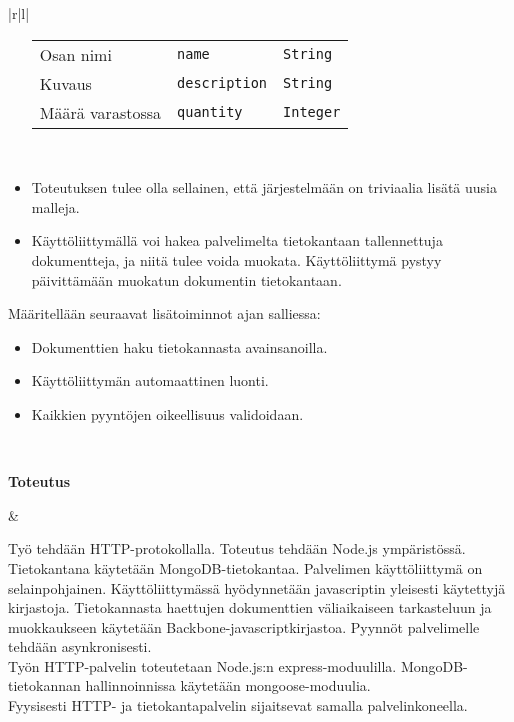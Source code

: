 \documentclass[a4paper, 12pt]{article}
\begin{document}
\begin{tabular}{|r|l|}
\begin{minipage}[t]{0.75\textwidth}
\begin{itemize}
	{\footnotesize
	\begin{tabular}{@{}l l l}
	Osan nimi & \texttt{name} & \texttt{String} \\
	Kuvaus & \texttt{description} & \texttt{String} \\
	Määrä varastossa & \texttt{quantity} & \texttt{Integer}
	\end{tabular}
	} \\
	
	\item Toteutuksen tulee olla sellainen, että järjestelmään on triviaalia lisätä uusia malleja.
	\item Käyttöliittymällä voi hakea palvelimelta tietokantaan tallennettuja dokumentteja, ja niitä tulee voida muokata. Käyttöliittymä pystyy päivittämään muokatun dokumentin tietokantaan.
	\end{itemize}

	Määritellään seuraavat lisätoiminnot ajan salliessa:
	\begin{itemize}
	\item Dokumenttien haku tietokannasta avainsanoilla.
	\item Käyttöliittymän automaattinen luonti.
	\item Kaikkien pyyntöjen oikeellisuus validoidaan.
	\end{itemize}
	\end{minipage} \\ \hline
	\begin{minipage}[t]{0.2\textwidth}
	\hfill \textbf{Toteutus}
	\end{minipage} & 
	\begin{minipage}[t]{0.75\textwidth}
	Työ tehdään HTTP-protokollalla. Toteutus tehdään Node.js ympäristössä. Tietokantana käytetään MongoDB-tietokantaa. Palvelimen käyttöliittymä on selainpohjainen. Käyttöliittymässä hyödynnetään javascriptin yleisesti käytettyjä kirjastoja. Tietokannasta haettujen dokumenttien väliaikaiseen tarkasteluun ja muokkaukseen käytetään Backbone-javascriptkirjastoa. Pyynnöt palvelimelle tehdään asynkronisesti. \\
	
	Työn HTTP-palvelin toteutetaan Node.js:n express-moduulilla. MongoDB-tietokannan hallinnoinnissa käytetään mongoose-moduulia. \\

	Fyysisesti HTTP- ja tietokantapalvelin sijaitsevat samalla palvelinkoneella. \\


\end{minipage}
\end{tabular}
\end{document}
